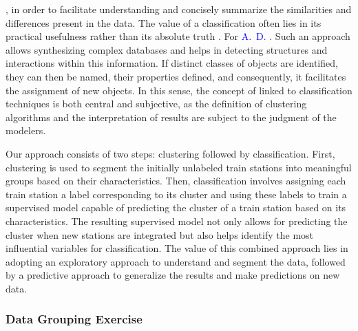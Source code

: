 \begin{refsegment}
{}, in order to facilitate understanding and concisely summarize the similarities and differences present in the data. The value of a classification often lies in its practical usefulness rather than its absolute truth \textcolor{blue}{\autocite[4]{everitt_cluster_2011}}. For \textcolor{blue}{A.~D.} \textcolor{blue}{\textcite[5]{gordon_classification_1999}}. Such an approach allows synthesizing complex databases and helps in detecting structures and interactions within this information. If distinct classes of objects are identified, they can then be named, their properties defined, and consequently, it facilitates the assignment of new objects. In this sense, the concept of  linked to classification techniques is both central and subjective, as the definition of clustering algorithms and the interpretation of results are subject to the judgment of the modelers.%

Our approach consists of two steps: clustering followed by classification. First, clustering is used to segment the initially unlabeled train stations into meaningful groups based on their characteristics. Then, classification involves assigning each train station a label corresponding to its cluster and using these labels to train a supervised model capable of predicting the cluster of a train station based on its characteristics. The resulting supervised model not only allows for predicting the cluster when new stations are integrated but also helps identify the most influential variables for classification. The value of this combined approach lies in adopting an exploratory approach to understand and segment the data, followed by a predictive approach to generalize the results and make predictions on new data.%

\subsubsection*{Data Grouping Exercise
    \label{chap6:methodologie-statistiques-clusterisation}
    }


\end{refsegment}
